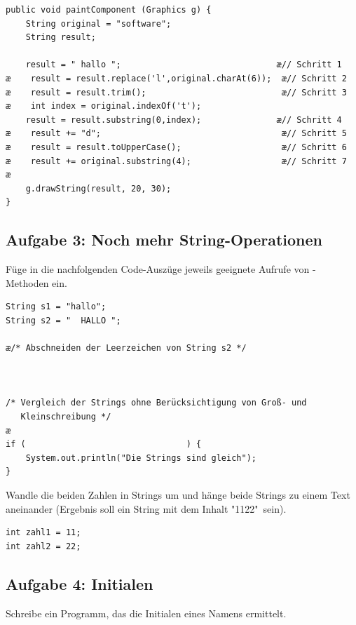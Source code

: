 \begin{lstlisting}
public void paintComponent (Graphics g) {
    String original = "software";
    String result;

    result = " hallo ";                               æ// Schritt 1
æ    result = result.replace('l',original.charAt(6));  æ// Schritt 2
æ    result = result.trim();                           æ// Schritt 3
æ    int index = original.indexOf('t');
    result = result.substring(0,index);               æ// Schritt 4
æ    result += "d";                                    æ// Schritt 5
æ    result = result.toUpperCase();                    æ// Schritt 6
æ    result += original.substring(4);                  æ// Schritt 7
æ
    g.drawString(result, 20, 30);
}
\end{lstlisting}


\subsection{Aufgabe 3: Noch mehr String-Operationen}

Füge in die nachfolgenden Code-Auszüge jeweils geeignete Aufrufe von
-Methoden ein.

\begin{compactenum}[a)]
\item
\begin{lstlisting}
String s1 = "hallo";
String s2 = "  HALLO ";

æ/* Abschneiden der Leerzeichen von String s2 */



/* Vergleich der Strings ohne Berücksichtigung von Groß- und    
   Kleinschreibung */
æ
if (								) {
    System.out.println("Die Strings sind gleich");
}
\end{lstlisting}

\item Wandle die beiden Zahlen in Strings um und hänge beide Strings zu
einem Text aneinander (Ergebnis soll ein String mit dem Inhalt "1122"\ sein). 
\begin{lstlisting}
int zahl1 = 11;
int zahl2 = 22;
\end{lstlisting}
\end{compactenum}


\subsection{Aufgabe 4: Initialen}

Schreibe ein Programm, das die Initialen eines Namens ermittelt. 

